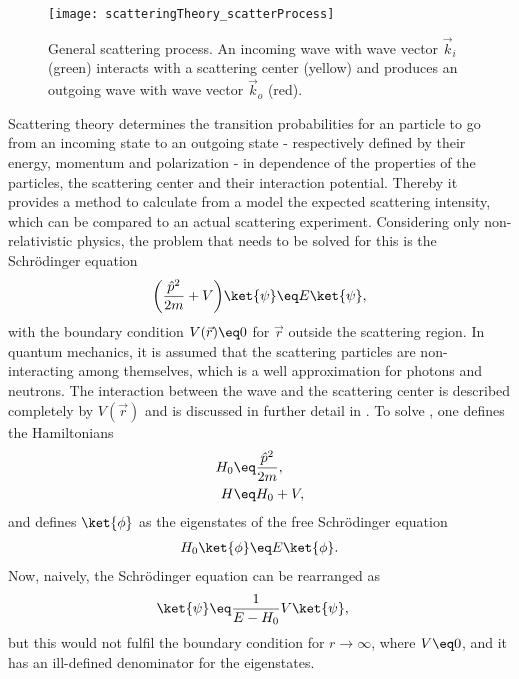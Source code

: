 \documentclass[\main/dresen_thesis.tex]{subfiles}
\begin{document}
\begin{figure}[tb]
  \centering
  \texttt{[image: scatteringTheory\_scatterProcess]}
  \caption{\label{fig:theoreticalBackground:scattering:scatteringTheory:scatteringProcess}General scattering process. An incoming wave with wave vector $\vec{k}_i$ (green) interacts with a scattering center (yellow) and produces an outgoing wave with wave vector $\vec{k}_o$ (red).}
\end{figure}

Scattering theory determines the transition probabilities for an particle to go from an incoming state to an outgoing state - respectively defined by their energy, momentum and polarization - in dependence of the properties of the particles, the scattering center and their interaction potential.
Thereby it provides a method to calculate from a model the expected scattering intensity, which can be compared to an actual scattering experiment.
Considering only non-relativistic physics, the problem that needs to be solved for this is the Schr\"odinger equation
\begin{align}
  \label{eq:theoreticalBackground:scattering:scatteringTheory:schrodingerEquation}
  \bigg(\frac{\hat{p}^2}{2m} + V \bigg) \ket{\psi} \eq E \ket{\psi},
\end{align}
with the boundary condition $V(\vec{r}) \eq 0$ for $\vec{r}$ outside the scattering region. In quantum mechanics, it is assumed that the scattering particles are non-interacting among themselves, which is a well approximation for photons and neutrons. 
The interaction between the wave and the scattering center is described completely by $V(\vec{r})$ and is discussed in further detail in . 
To solve , one defines the Hamiltonians
\begin{align}
  H_0 &\eq \frac{\hat{p}^2}{2m},\\
  H &\eq H_0 + V,
\end{align}
and defines $\ket{\phi}$ as the eigenstates of the free Schr\"odinger equation
\begin{align}
  H_0 \ket{\phi} &\eq E \ket{\phi}.\\
\end{align}
Now, naively, the Schr\"odinger equation can be rearranged as
\begin{align}
  \ket{\psi} &\eq \frac{1}{E - H_0} V \ket{\psi},
\end{align}
but this would not fulfil the boundary condition for $r \rightarrow \infty$, where $V\eq0$, and it has an ill-defined denominator for the eigenstates. 
\end{document}
